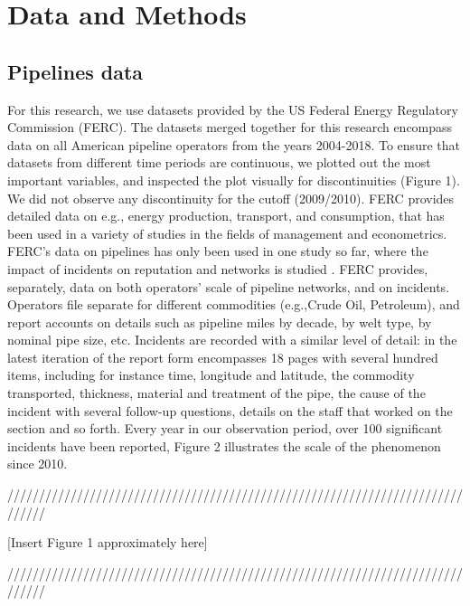 \section{Data and Methods}
\subsection{Pipelines data}
For this research, we use datasets provided by the US Federal Energy Regulatory Commission (FERC). The datasets merged together for this research encompass data on all American pipeline operators from the years 2004-2018. To ensure that datasets from different time periods are continuous, we plotted out the most important variables, and inspected the plot visually for discontinuities (Figure 1). We did not observe any discontinuity for the cutoff (2009/2010). FERC provides detailed data on e.g., energy production, transport, and consumption, that has been used in a variety of studies in the fields of management and econometrics. FERC's data on pipelines has only been used in one study so far, where the impact of incidents on reputation and networks is studied \citep{Park2019}. FERC provides, separately, data on both operators' scale of pipeline networks, and on incidents. Operators file separate for different commodities (e.g.,Crude Oil, Petroleum), and report accounts on details such as pipeline miles by decade, by welt type, by nominal pipe size, etc. Incidents are recorded with a similar level of detail: in the latest iteration of the report form encompasses 18 pages with several hundred items, including for instance time, longitude and latitude, the commodity transported, thickness, material and treatment of the pipe, the cause of the incident with several follow-up questions, details on the staff that worked on the section and so forth. Every year in our observation period, over 100 significant incidents have been reported, Figure 2 illustrates the scale of the phenomenon since 2010.

{\centering
	//////////////////////////////////////////////////////////////////////////////
	
	[Insert Figure 1 approximately here]
	
	//////////////////////////////////////////////////////////////////////////////\par
}

